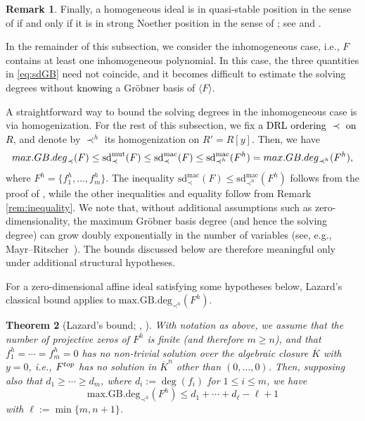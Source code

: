 \documentclass{article}
\newtheorem{theorem}{Theorem}[subsection]
\theoremstyle{definition}
\newtheorem{remark}[theorem]{Remark}
\theoremstyle{plain}
\theoremstyle{plain}
\theoremstyle{plain}
\theoremstyle{plain}
\numberwithin{equation}{subsection}
\begin{document}
\begin{remark}
Finally, a homogeneous ideal is in quasi-stable position in the sense of \cite{HSS18} if and only if it is in strong Noether position in the sense of \cite{Hashemi2010};
see \cite[Definition~3.1 and Proposition~3.2(v)]{HSS18} and \cite[Definition~2.4, Theorem~2.19, and Corollary~2.20]{Hashemi2010}.
\end{remark}

In the remainder of this subsection, we consider the inhomogeneous case, i.e., $F$ contains at least one inhomogeneous polynomial.
In this case, the three quantities in \eqref{eq:sdGB} need not coincide, and it becomes difficult to estimate the solving degrees without \textcolor{black}{knowing} a Gr\"{o}bner basis of $\langle F \rangle$.

A straightforward way to bound the solving degrees in the inhomogeneous case is via homogenization.
For the rest of this subsection, we fix \textcolor{black}{a DRL ordering $\prec$ on $R$}, and denote by $\prec^h$ its homogenization on $R'=R[y]$.
Then, we have
\[
{\rm max.GB.deg}_{\prec}(F) \leq \mathrm{sd}^{\mathrm{mut}}_{\prec}(F) \leq \mathrm{sd}^{\mathrm{mac}}_{\prec}(F)
\leq  \mathrm{sd}^{\mathrm{mac}}_{\prec^h}(F^h)
= {\rm max.GB.deg}_{\prec^h}(F^h),
\]
where $F^h=\{f_1^h, \ldots, f_m^h\}$.
The inequality $\mathrm{sd}^{\mathrm{mac}}_{\prec}(F) \leq \mathrm{sd}^{\mathrm{mac}}_{\prec^h}(F^h)$ follows from the proof of \cite[Theorem~7]{CG20}, while the other inequalities and equality follow from Remark \ref{rem:inequality}.
We note that, without additional assumptions such as zero-dimensionality, the maximum Gr\"obner basis degree (and hence the solving degree) can grow doubly exponentially in the number of variables (see, e.g., Mayr--Ritscher~\cite{MR13}).
The bounds discussed below are therefore meaningful only under additional structural hypotheses.

For a zero-dimensional affine ideal satisfying some hypotheses below, Lazard's classical bound applies to $\mathrm{max.GB.deg}_{\prec^h}(F^h)$.

\begin{theorem}[{Lazard's bound}; {\cite[Theorem 2]{Lazard}}, {\cite[Th\'{e}or\`{e}m 3.3]{Lazard81}}]\label{thm:Lazard_zero_dim}
With notation as above, we assume that the number of projective zeros of $F^h$ is finite (and therefore $m \geq n$), and that $f_1^h=\cdots = f_m^h=0$ has no non-trivial solution over the algebraic closure $\overline{K}$ with $y=0$, i.e., $F^{\rm top}$ has no solution in $\overline{K}^n$ other than $(0,\ldots , 0)$.
Then, supposing also that $d_1 \geq \cdots \geq d_m$, where $d_i:=\deg(f_i)$ for $1\leq i\leq m$, we have
\begin{equation}\label{eq:Lazard0} \mathrm{max.GB.deg}_{\prec^h}(F^h) \leq d_1 + \cdots + d_{\ell} - \ell + 1
\end{equation}
with $\ell := \min\{ m,n+1 \}$.
\end{theorem}
\end{document}
